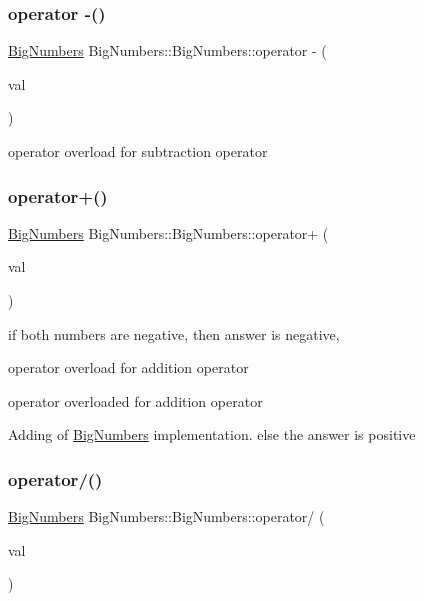 \subsubsection{\texorpdfstring{operator -\/()}{operator -()}}
{\footnotesize\ttfamily \mbox{\hyperlink{class_big_numbers_1_1_big_numbers}{Big\+Numbers}} Big\+Numbers\+::\+Big\+Numbers\+::operator -\/ (\begin{DoxyParamCaption}\item[{\mbox{\hyperlink{class_big_numbers_1_1_big_numbers}{Big\+Numbers}} \&}]{val }\end{DoxyParamCaption})}

operator overload for subtraction operator \mbox{\label{class_big_numbers_1_1_big_numbers_a5083165e6ad1d017a4cf2e470c66bdff}} 
\subsubsection{\texorpdfstring{operator+()}{operator+()}}
{\footnotesize\ttfamily \mbox{\hyperlink{class_big_numbers_1_1_big_numbers}{Big\+Numbers}} Big\+Numbers\+::\+Big\+Numbers\+::operator+ (\begin{DoxyParamCaption}\item[{\mbox{\hyperlink{class_big_numbers_1_1_big_numbers}{Big\+Numbers}} \&}]{val }\end{DoxyParamCaption})}



if both numbers are negative, then answer is negative, 

operator overload for addition operator

operator overloaded for addition operator

Adding of \mbox{\hyperlink{class_big_numbers_1_1_big_numbers}{Big\+Numbers}} implementation. else the answer is positive \mbox{\label{class_big_numbers_1_1_big_numbers_ae71572550fb1f47d3659cf2cefd04534}} 
\subsubsection{\texorpdfstring{operator/()}{operator/()}}
{\footnotesize\ttfamily \mbox{\hyperlink{class_big_numbers_1_1_big_numbers}{Big\+Numbers}} Big\+Numbers\+::\+Big\+Numbers\+::operator/ (\begin{DoxyParamCaption}\item[{\mbox{\hyperlink{class_big_numbers_1_1_big_numbers}{Big\+Numbers}} \&}]{val }\end{DoxyParamCaption})}



